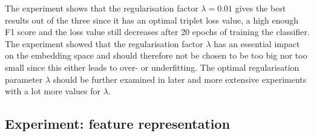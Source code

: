 \newline
\newline
The experiment shows that the regularisation factor $\lambda = 0.01$ gives the best results out of the three since it has an optimal triplet loss value, a high enough F1 score and the loss value still decreases after 20 epochs of training the classifier.
\newline
\newline
The experiment showed that the regularisation factor $\lambda$ has an essential impact on the embedding space and should therefore not be chosen to be too big nor too small since this either leads to over- or underfitting. The optimal regularisation parameter $\lambda$ should be further examined in later and more extensive experiments with a lot more values for $\lambda$.

\subsection{Experiment: feature representation}

